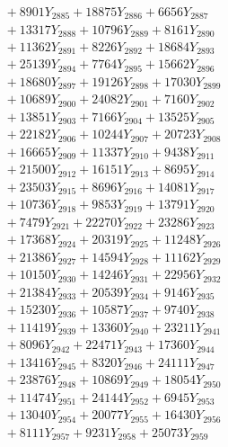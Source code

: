 \documentclass[a4paper,10pt]{article}
\begin{document}
{\begin{align}
&\;  + 8901 Y_{2885} + 18875 Y_{2886} + 6656 Y_{2887} \\[0.3ex]
&\;  + 13317 Y_{2888} + 10796 Y_{2889} + 8161 Y_{2890} \\[0.3ex]
&\;  + 11362 Y_{2891} + 8226 Y_{2892} + 18684 Y_{2893} \\[0.3ex]
&\;  + 25139 Y_{2894} + 7764 Y_{2895} + 15662 Y_{2896} \\[0.3ex]
&\;  + 18680 Y_{2897} + 19126 Y_{2898} + 17030 Y_{2899} \\[0.3ex]
&\;  + 10689 Y_{2900} + 24082 Y_{2901} + 7160 Y_{2902} \\[0.3ex]
&\;  + 13851 Y_{2903} + 7166 Y_{2904} + 13525 Y_{2905} \\[0.3ex]
&\;  + 22182 Y_{2906} + 10244 Y_{2907} + 20723 Y_{2908} \\[0.5ex]\allowbreak
&\;  + 16665 Y_{2909} + 11337 Y_{2910} + 9438 Y_{2911} \\[0.3ex]
&\;  + 21500 Y_{2912} + 16151 Y_{2913} + 8695 Y_{2914} \\[0.3ex]
&\;  + 23503 Y_{2915} + 8696 Y_{2916} + 14081 Y_{2917} \\[0.3ex]
&\;  + 10736 Y_{2918} + 9853 Y_{2919} + 13791 Y_{2920} \\[0.3ex]
&\;  + 7479 Y_{2921} + 22270 Y_{2922} + 23286 Y_{2923} \\[0.3ex]
&\;  + 17368 Y_{2924} + 20319 Y_{2925} + 11248 Y_{2926} \\[0.3ex]
&\;  + 21386 Y_{2927} + 14594 Y_{2928} + 11162 Y_{2929} \\[0.3ex]
&\;  + 10150 Y_{2930} + 14246 Y_{2931} + 22956 Y_{2932} \\[0.3ex]
&\;  + 21384 Y_{2933} + 20539 Y_{2934} + 9146 Y_{2935} \\[0.3ex]
&\;  + 15230 Y_{2936} + 10587 Y_{2937} + 9740 Y_{2938} \\[0.5ex]\allowbreak
&\;  + 11419 Y_{2939} + 13360 Y_{2940} + 23211 Y_{2941} \\[0.3ex]
&\;  + 8096 Y_{2942} + 22471 Y_{2943} + 17360 Y_{2944} \\[0.3ex]
&\;  + 13416 Y_{2945} + 8320 Y_{2946} + 24111 Y_{2947} \\[0.3ex]
&\;  + 23876 Y_{2948} + 10869 Y_{2949} + 18054 Y_{2950} \\[0.3ex]
&\;  + 11474 Y_{2951} + 24144 Y_{2952} + 6945 Y_{2953} \\[0.3ex]
&\;  + 13040 Y_{2954} + 20077 Y_{2955} + 16430 Y_{2956} \\[0.3ex]
&\;  + 8111 Y_{2957} + 9231 Y_{2958} + 25073 Y_{2959} \\[0.3ex]

\end{align}}
\end{document}
